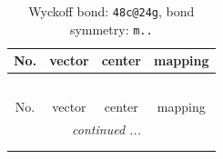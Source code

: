 \documentclass[fleqn,8pt]{jsarticle}
\begin{document}
\renewcommand{\arraystretch}{1.2}
\begin{longtable}{cccc}
\caption{Wyckoff bond: {\tt 48c@24g}, bond symmetry: {\tt m..}}
 \\
 \hline \hline
No. & vector & center & mapping \\ \hline \endfirsthead

\multicolumn{3}{l}{\tablename\ \thetable{}} \\
 \hline \hline
No. & vector & center & mapping \\ \hline \endhead

 \hline \hline
\multicolumn{3}{r}{\footnotesize\it continued ...} \\ \endfoot

 \hline \hline
\multicolumn{3}{r}{} \\ \endlastfoot


\end{longtable}
\end{document}
